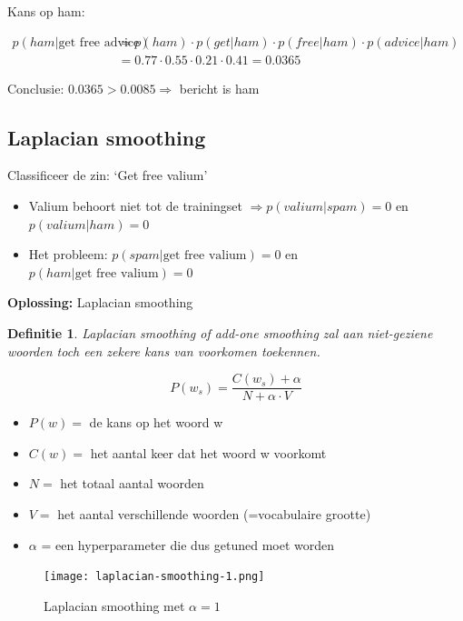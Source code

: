 \documentclass{article}
\newtheorem{theorem}{Definitie}[section]
\begin{document}
Kans op ham:

\begin{align*}
    p(ham | \text{get free advice}) & = p(ham) \cdot p(get|ham) \cdot p(free|ham) \cdot p(advice | ham)\\
    & = 0.77 \cdot 0.55 \cdot 0.21 \cdot 0.41 = 0.0365
\end{align*}

Conclusie: $0.0365 > 0.0085 \Rightarrow$ bericht is ham

\subsection{Laplacian smoothing}

Classificeer de zin: `Get free valium'

\begin{itemize}
    \item Valium behoort niet tot de trainingset $\Rightarrow p(valium | spam) = 0$ en $p(valium | ham) = 0$
    \item Het probleem: $p(spam | \text{get free valium}) = 0$ en $p(ham | \text{get free valium}) = 0$
\end{itemize}

\textbf{Oplossing:} Laplacian smoothing 

\begin{theorem}
    Laplacian smoothing of add-one smoothing zal aan niet-geziene woorden toch een zekere kans van voorkomen toekennen.
\end{theorem}

\begin{equation}
    P(w_s) = \frac{C(w_s) + \alpha}{N + \alpha \cdot V}
\end{equation}

\begin{itemize}
    \item $P(w) =$ de kans op het woord w
    \item $C(w) =$ het aantal keer dat het woord w voorkomt
    \item $N =$ het totaal aantal woorden
    \item $V =$ het aantal verschillende woorden (=vocabulaire grootte)
    \item $\alpha$ = een hyperparameter die dus getuned moet worden
\end{itemize}

\begin{figure}[H]
    \centering
    \texttt{[image: laplacian-smoothing-1.png]}
    \caption{Laplacian smoothing met $\alpha = 1$}
\end{figure}
\end{document}
